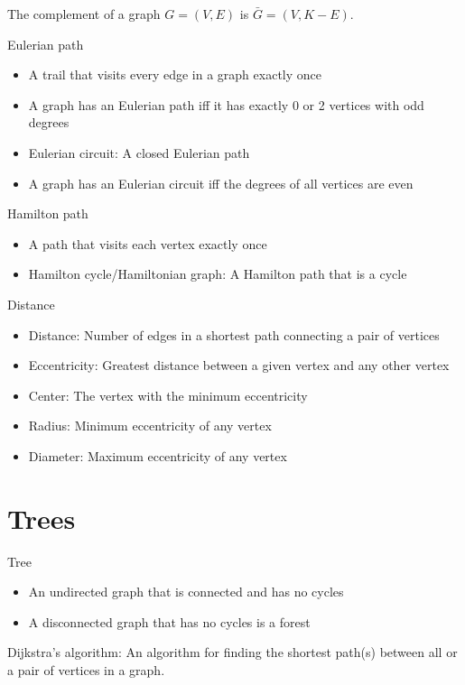 \documentclass{article}
\begin{document}
The complement of a graph $G = (V, E)$ is $\bar{G} = (V, K - E)$.

Eulerian path
\begin{itemize}
    \item A trail that visits every edge in a graph exactly once
    \item A graph has an Eulerian path iff it has exactly 0 or 2 vertices with odd degrees
    \item Eulerian circuit: A closed Eulerian path
    \item A graph has an Eulerian circuit iff the degrees of all vertices are even
\end{itemize}

Hamilton path
\begin{itemize}
    \item A path that visits each vertex exactly once
    \item Hamilton cycle/Hamiltonian graph: A Hamilton path that is a cycle
\end{itemize}

Distance
\begin{itemize}
    \item Distance: Number of edges in a shortest path connecting a pair of vertices
    \item Eccentricity: Greatest distance between a given vertex and any other vertex
    \item Center: The vertex with the minimum eccentricity
    \item Radius: Minimum eccentricity of any vertex
    \item Diameter: Maximum eccentricity of any vertex
\end{itemize}

\section{Trees}

Tree
\begin{itemize}
    \item An undirected graph that is connected and has no cycles
    \item A disconnected graph that has no cycles is a forest
\end{itemize}

Dijkstra's algorithm: An algorithm for finding the shortest path(s) between all or a pair of vertices in a graph.

\begin{gather*}
\end{gather*}
\end{document}
